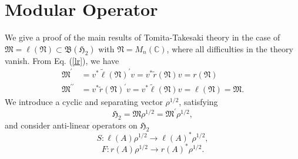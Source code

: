 \section{Modular Operator}
We give a proof  of the main results of Tomita-Takesaki theory in the case of 
$\mathfrak{M}=\ell(\mathfrak{N}) \subset \mathfrak{B}(\mathfrak{H}_2)$ with $\mathfrak{N}=M_n(\mathbb{C})$,
where all difficulties in the theory vanish.
From Eq. (\ref{lr}),
we have
\begin{equation}
\begin{split}
\mathfrak{M}^\prime&=v^\ast \tilde{\ell}(\mathfrak{N})^\prime v= v^\ast \tilde{r}(\mathfrak{N})v=r(\mathfrak{N}) \\
\mathfrak{M}^{\prime\prime}&=v^\ast \tilde{r}(\mathfrak{N})^\prime v= v^\ast \tilde{\ell}(\mathfrak{N})v=\ell(\mathfrak{N})=\mathfrak{M}.
\end{split}
\end{equation}
We introduce  a cyclic and separating vector $\rho^{1/2}$, satisfying 
$$
\mathfrak{H}_2=\mathfrak{M}\rho^{1/2}=\mathfrak{M}^\prime \rho^{1/2},
$$
and consider  anti-linear operators on $\mathfrak{H}_2$ 
\begin{equation}\label{OprS}
		 S:\ell(A) \rho^{1/2} \to \ell(A)^\ast\rho^{1/2},
\end{equation}
\begin{equation}\label{OprF}
		 F:r(A) \rho^{1/2} \to r(A)^\ast\rho^{1/2}.
\end{equation}
